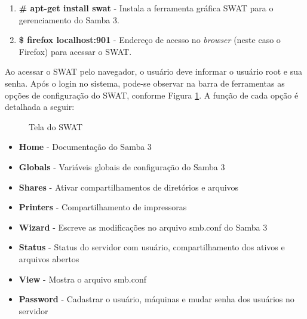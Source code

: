 \begin{enumerate}
 \item \textbf{\# apt-get install swat} - Instala a ferramenta gráfica SWAT para o gerenciamento do Samba 3.
    \item \textbf{\$ firefox localhost:901} - Endereço de acesso no \textit{browser} (neste caso o Firefox) para acessar o SWAT.
\end{enumerate}

Ao acessar o SWAT pelo navegador, o usuário deve informar o usuário root e sua senha. Após o login no sistema, pode-se observar na barra de ferramentas as opções de configuração do SWAT, conforme Figura \ref{swat}. A função de cada opção é detalhada a seguir:

\begin{figure}[ht]
   	\centering
   	\caption{Tela do SWAT}
    \label{swat}
\end{figure}

\begin{itemize}
    \item \textbf{Home} - Documentação do Samba 3
    \item \textbf{Globals} - Variáveis globais de configuração do Samba 3
    \item \textbf{Shares} - Ativar compartilhamentos de diretórios e arquivos
    \item \textbf{Printers} - Compartilhamento de impressoras
    \item \textbf{Wizard} - Escreve as modificações no arquivo smb.conf do Samba 3
    \item \textbf{Status} - Status do servidor com usuário, compartilhamento dos ativos e arquivos abertos
    \item \textbf{View} - Mostra o arquivo smb.conf
    \item \textbf{Password} - Cadastrar o usuário, máquinas e mudar senha dos usuários no servidor
\end{itemize}

